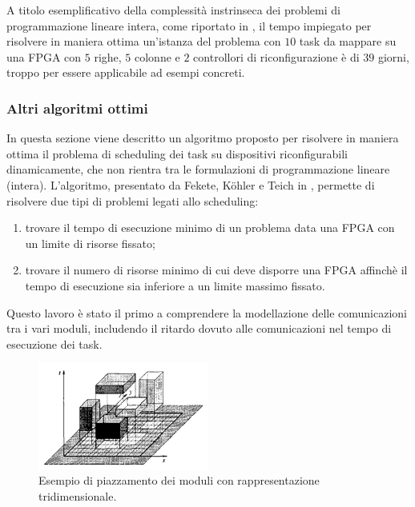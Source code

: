 A titolo esemplificativo della complessità instrinseca dei problemi di programmazione
lineare intera, come riportato in \cite{Redaelli2DILP}, il tempo impiegato per risolvere in 
maniera ottima un'istanza del problema con $10$ task da mappare su una 
\ac{FPGA} con $5$ righe, $5$ colonne e $2$ controllori di riconfigurazione è di 
$39$ giorni, troppo per essere applicabile ad esempi concreti.


\subsubsection{Altri algoritmi ottimi}
In questa sezione viene descritto un algoritmo proposto per risolvere in 
maniera ottima il problema di scheduling dei task su dispositivi 
riconfigurabili dinamicamente, che non rientra tra le formulazioni di 
programmazione lineare (intera). L'algoritmo, presentato da Fekete, K\"ohler 
e Teich in \cite{FeketeOptimal}, permette di risolvere due tipi di problemi 
legati allo scheduling:
\begin{enumerate}
 \item trovare il tempo di esecuzione minimo di un problema data una \ac{FPGA} 
con un limite di risorse fissato;
 \item trovare il numero di risorse minimo di cui deve disporre una \ac{FPGA} 
affinchè il tempo di esecuzione sia inferiore a un limite massimo fissato.
\end{enumerate}

Questo lavoro è stato il primo a comprendere la modellazione delle 
comunicazioni tra i vari moduli, includendo il ritardo dovuto alle 
comunicazioni nel tempo di esecuzione dei task.

\begin{figure}[!tb]
 \begin{center}
  \includegraphics[width=0.5\textwidth]
{capitoli/figure/cap3/BoxModules.pdf}
\caption[Piazzamento dei moduli con rappresentazione tridimensionale]{Esempio 
di piazzamento dei moduli con rappresentazione tridimensionale.\footnotemark}
\label{fig:boxModules}
 \end{center}
\end{figure}


